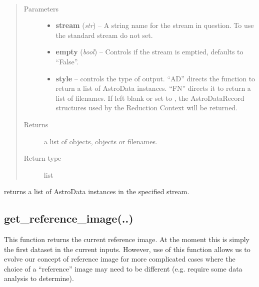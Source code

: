\documentclass[letterpaper,10pt,english]{sphinxmanual}
\begin{document}
\begin{fulllineitems}
\label{chapter_ReductionContextClass:astrodata.RecipeManager.ReductionContext.get_stream}~\begin{quote}\begin{description}
\item[{Parameters}] \leavevmode\begin{itemize}
\item {} 
\textbf{stream} (\emph{str}) -- A string name for the stream in question.  
To use the standard stream do not set.

\item {} 
\textbf{empty} (\emph{bool}) -- Controls if the stream is
emptied, defaults to ``False''.

\item {} 
\textbf{style} -- controls the type of output. ``AD'' directs the function
to return a list
of AstroData instances. ``FN'' directs it to return a list of filenames.
If left blank or set to , the AstroDataRecord structures used
by the Reduction Context will be returned.

\end{itemize}

\item[{Returns}] \leavevmode
a list of  objects,  objects or filenames.

\item[{Return type}] \leavevmode
list

\end{description}\end{quote}

 returns a list of AstroData instances in the specified stream.

\end{fulllineitems}



\subsection{get\_reference\_image(..)}
\label{chapter_ReductionContextClass:get-reference-image}

\begin{fulllineitems}
\label{chapter_ReductionContextClass:astrodata.RecipeManager.ReductionContext.get_reference_image}
This function returns the current reference image.  At the moment
this is simply the first dataset in the current inputs.  However,
use of this function allows us to evolve our concept of reference
image for more complicated cases where the choice of a ``reference'' image
may need to be different (e.g. require some data analysis to determine).

\end{fulllineitems}
\end{document}
